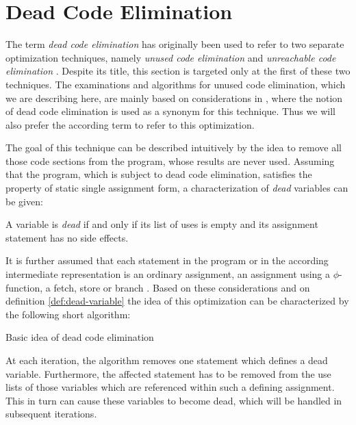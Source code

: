 \section{Dead Code Elimination}
\label{sec:dead-code}

The term \emph{dead code elimination} has originally been used to refer to two separate optimization techniques, namely \emph{unused code elimination} and \emph{unreachable code elimination} \cite{wegman:1991:constantpropagation}. Despite its title, this section is targeted only at the first of these two techniques. The examinations and algorithms for unused code elimination, which we are describing here, are mainly based on considerations in \cite{appel:2004:moderncompilerimpl}, where the notion of dead code elimination is used as a synonym for this technique. Thus we will also prefer the according term to refer to this optimization.

The goal of this technique can be described intuitively by the idea to remove all those code sections from the program, whose results are never used. Assuming that the program, which is subject to dead code elimination, satisfies the property of static single assignment form, a characterization of \emph{dead} variables can be given:
\begin{definition}\label{def:dead-variable}
A variable is \emph{dead} if and only if its list of uses is empty and its assignment statement has no side effects.
\end{definition}

It is further assumed that each statement in the program or in the according intermediate representation is an ordinary assignment, an assignment using a $\phi$-function, a fetch, store or branch \cite{appel:2004:moderncompilerimpl}. Based on these considerations and on definition \ref{def:dead-variable} the idea of this optimization can be characterized by the following short algorithm:

\begin{algorithm}
\caption{Basic idea of dead code elimination}
\label{alg:dead-basic}
\begin{algorithmic}[1]
\EndWhile
\end{algorithmic}
\end{algorithm}

At each iteration, the algorithm removes one statement which defines a dead variable. Furthermore, the affected statement has to be removed from the use lists of those variables which are referenced within such a defining assignment. This in turn can cause these variables to become dead, which will be handled in subsequent iterations.

